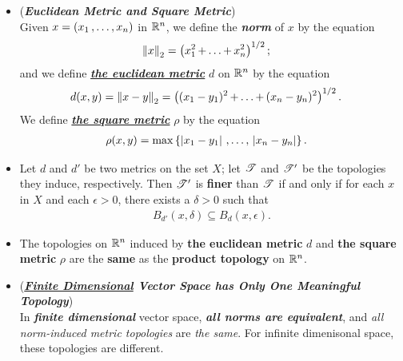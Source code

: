 \documentclass[11pt]{article}
\begin{document}
\begin{itemize}
\item \begin{definition} (\emph{\textbf{Euclidean Metric and Square Metric}})\\
Given $x = (x_1 \,{,}\ldots{,}\, x_n)$ in ${\mathbb R}^n$, we define the \emph{\textbf{norm}} of $x$ by the equation
\begin{align*}
\left\|x\right\|_{2} &= \left(x_1^2 \,{+}\ldots{+}\, x_n^2\right)^{1/2};
\end{align*}
and we define \underline{\emph{\textbf{the euclidean metric}}} $d$ on ${\mathbb R}^n$ by the equation
\begin{align*}
d(x, y) = \left\|x - y\right\|_{2} &= \left((x_1 - y_1)^2 \,{+}\ldots{+}\, (x_n - y_n)^2\right)^{1/2}.
\end{align*}
We define \underline{\emph{\textbf{the square metric}}} $\rho$ by the equation
\begin{align*}
\rho(x, y) &= \max\left\{\left\lvert x_1 - y_1 \right\rvert \,{,}\ldots{,}\, \left\lvert x_n - y_n \right\rvert\right\}.
\end{align*}
\end{definition}

\item \begin{lemma}
Let $d$ and $d'$ be two metrics on the set $X$; let ${\mathscr T}$ and ${\mathscr T}'$ be the topologies they induce, respectively. Then ${\mathscr T}'$ is \textbf{finer} than ${\mathscr T}$ if and only if for each $x$ in $X$ and each $\epsilon > 0$, there exists a $\delta > 0$ such that
\begin{align*}
B_{d'}(x, \delta) \subseteq  B_{d}(x, \epsilon).
\end{align*}
\end{lemma}

\item \begin{proposition}
The topologies on ${\mathbb R}^n$ induced by \textbf{the euclidean metric} $d$ and \textbf{the square metric} $\rho$ are the \textbf{same} as the \textbf{product topology} on ${\mathbb R}^n$.
\end{proposition}

\item \begin{remark} (\emph{\textbf{\underline{Finite Dimensional} Vector Space has Only One Meaningful Topology}})\\
In \emph{\textbf{finite dimensional}} vector space, \emph{\textbf{all norms are equivalent}}, and  \emph{all norm-induced metric topologies} are \emph{the same}. For infinite dimenisonal space, these topologies are different.
\end{remark}


\end{itemize}
\end{document}
